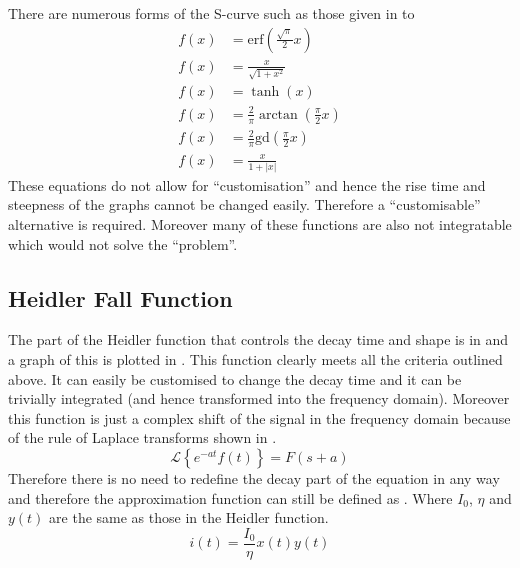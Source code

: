 There are numerous forms of the S-curve such as those given in  to 
\begin{subequations}
    \label{eqn:scurve}
    \begin{align}
        f(x) & = \mathrm{erf} \left ( \frac{\sqrt{\pi}}{2}x \right ) \label{eqn:erf} \\
        f(x) & = \frac{x}{\sqrt{1+x^2}} \label{eqn:sqrt} \\
        f(x) & = \tanh(x) \label{eqn:tanh} \\
        f(x) & = \frac{2}{\pi}\arctan \left ( \frac{\pi}{2}x \right ) \label{eqn:atan} \\
        f(x) & = \frac{2}{\pi}\mathrm{gd} \left ( \frac{\pi}{2}x \right ) \label{eqn:gd} \\
        f(x) & = \frac{x}{1+|x|} \label{eqn:abs}
    \end{align}
\end{subequations}
These equations do not allow for ``customisation'' and hence the rise time and steepness of the graphs cannot be changed easily. Therefore a ``customisable'' alternative is required. Moreover many of these functions are also not integratable which would not solve the ``problem''.



\subsection{Heidler Fall Function}
\label{sub:approx_heidler_fall_function}

The part of the Heidler function that controls the decay time and shape is in  and a graph of this is plotted in . This function clearly meets all the criteria outlined above. It can easily be customised to change the decay time and it can be trivially integrated (and hence transformed into the frequency domain).
Moreover this function is just a complex shift of the signal in the frequency domain because of the rule of Laplace transforms shown in  \cite{bkSST,bkControl}.
\begin{equation}
    \mathcal{L} \left \{ e^{-at}f\left ( t \right ) \right \} = F \left (s + a \right )
    \label{eqn:laplaceComplexShift}
\end{equation}
Therefore there is no need to redefine the decay part of the equation in any way and therefore the approximation function can still be defined as . Where $I_0$, $\eta$ and $y(t)$ are the same as those in the Heidler function.
\begin{equation}
i(t) = \frac{I_0}{\eta} x \left( t \right) y \left( t \right)
\label{eqn:PreTFSmall}
\end{equation}

